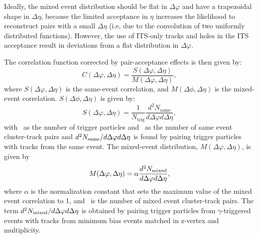 Ideally, the mixed event distribution should be flat in \(\Delta\varphi\) and have a trapezoidal shape in \(\Delta\eta\), because the limited acceptance in \(\eta\) increases the likelihood to reconstruct pairs with a small \(\Delta\eta\) (i.e, due to the convolution of two uniformly distributed functions). However, the use of ITS-only tracks and holes in the ITS acceptance result in deviations from a flat distribution in \(\Delta\varphi\). %

The correlation function corrected by pair-acceptance effects is then given by:
\begin{equation}
  \label{eq:Y}
  C(\Delta \varphi, \Delta \eta) = \frac{S(\Delta \varphi, \Delta \eta)}{M(\Delta \varphi, \Delta \eta)},
\end{equation}
where $S(\Delta \varphi, \Delta \eta)$ is the same-event correlation, and $M(\Delta \phi, \Delta \eta)$ is the mixed-event correlation. $S(\Delta \phi, \Delta \eta)$ is given by: 
\begin{equation}
  S(\Delta \varphi, \Delta \eta) = \frac{1}{N_{\mathrm{trig}}}\frac{d^2N_{\mathrm{same}}}{d\Delta \varphi d\Delta \eta},
\end{equation}
with \Ntrig~as the number of trigger particles and \Nsame~as the number of same event cluster-track pairs and $d^2N_{\mathrm{same}}/d\Delta \varphi d\Delta \eta$ is found by pairing trigger particles with tracks from the same event. The mixed-event distribution, $M(\Delta \varphi, \Delta \eta)$, is given by 
\begin{equation}
  M(\Delta \varphi, \Delta \eta) = \alpha \frac{d^2 N_{\mathrm{mixed}}}{d\Delta \varphi d\Delta \eta},
\end{equation}
where $\alpha$ is the normalization constant that sets the maximum value of the mixed event correlation to 1, and \Nmixed~is the number of mixed event cluster-track pairs. The term $d^2 N_{\mathrm{mixed}}/d\Delta \varphi d\Delta \eta$ is obtained by pairing trigger particles from \(\gamma\)-triggered events with tracks from minimum bias events matched in z-vertex and multiplicity.


